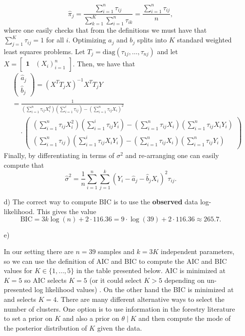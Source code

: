 \begin{enumerate}
\[
\hat{\pi}_j = \frac{ \sum_{i=1}^n \tau_{ij}}{\sum_{k=1}^K \sum_{i=1}^n \tau_{ik}} = \frac{ \sum_{i=1}^n \tau_{ij}}{n},
\]
where one easily checks that from the definitions we must have that $\sum_{j=1}^K \tau_{ij} = 1$ for all $i$. Optimizing $a_j$ and $b_j$ splits into $K$ standard weighted least squares problems. Let $T_j = \text{diag}(\tau_{1j},\dots,\tau_{nj})$ and let $X= \begin{bmatrix} \bm{1} & (X_i)_{i=1}^n \end{bmatrix}$. Then, we have that 
\begin{align*}
& \left( \begin{matrix}
 \hat{a}_j \\ \hat{b}_j
\end{matrix} \right) = (X^TT_jX)^{-1} X^TT_jY\\
& = \frac{1}{(\sum_{i=1}^n \tau_{ij} X_i^2)(\sum_{i=1}^i \tau_{ij}) - (\sum_{i=1}^n \tau_{ij}X_i)^2}\\
& \ \ \ \ \ \cdot \left( \begin{matrix}
(\sum_{i=1}^n \tau_{ij} X_i^2)(\sum_{i=1}^i \tau_{ij}Y_i) - (\sum_{i=1}^n \tau_{ij}X_i)(\sum_{i=1}^n \tau_{ij}X_iY_i) \\ (\sum_{i=1}^n \tau_{ij})(\sum_{i=1}^i \tau_{ij}X_iY_i) - (\sum_{i=1}^n \tau_{ij}X_i)(\sum_{i=1}^n \tau_{ij}Y_i)
\end{matrix} \right) 
\end{align*}
Finally, by differentiating in terms of $\sigma^2$ and re-arranging one can easily compute that 
\[
\hat{\sigma}^2 = \frac{1}{n} \sum_{i=1}^n \sum_{j=1}^k (Y_i - \hat{a}_j - \hat{b}_jX_i)^2 \tau_{ij}.
\]
\item[d)]
The correct way to compute BIC is to use the \textbf{observed} data log-likelihood. This gives the value
\[
\text{BIC} = 3k\log(n) + 2\cdot 116.36 = 9\cdot\log(39) + 2\cdot 116.36 \approx 265.7.
\]
\item[e)]

In our setting there are $n=39$ samples and $k=3K$ independent parameters, so we can use the definition of AIC and BIC to compute the AIC and BIC values for $K \in \{1,\dots,5 \}$ in the table presented below. AIC is minimized at $K=5$ so AIC selects $K=5$ (or it could select $K>5$ depending on un-presented log likelihood values) . On the other hand the BIC  is minimized at and selects $K=4$. There are many different alternative ways to select the number of clusters. One option is to use information in the forestry literature to set a prior on $K$ and also a prior on $\theta \mid K$ and then compute the mode of the posterior distribution of $K$ given the data. %
\end{enumerate}


